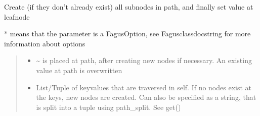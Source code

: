 \documentclass[a4paper,10pt,english]{sphinxmanual}
\begin{document}
\begin{fulllineitems}
\begin{fulllineitems}
\end{fulllineitems}


\begin{fulllineitems}
\label{\detokenize{fagus.fagus:fagus.fagus.Fagus.set}}
\pysigstartsignatures
{}
\pysigstopsignatures
\sphinxAtStartPar
Create (if they don’t already exist) all sub\sphinxhyphen{}nodes in path, and finally set value at leaf\sphinxhyphen{}node

\sphinxAtStartPar
* means that the parameter is a FagusOption, see Fagus\sphinxhyphen{}class\sphinxhyphen{}docstring for more information about options
\begin{quote}\begin{description}
\begin{itemize}
\item {}
\sphinxAtStartPar
{} \textendash{} \textasciitilde{} is placed at path, after creating new nodes if necessary. An existing value at path is overwritten

\item {}
\sphinxAtStartPar
{} \textendash{} List/Tuple of key\sphinxhyphen{}values that are traversed in self. If no nodes exist at the keys, new nodes are
created. Can also be specified as a string, that is split into a tuple using path\_split. See get()


\end{itemize}
\end{description}
\end{quote}
\end{fulllineitems}
\end{fulllineitems}
\end{document}
